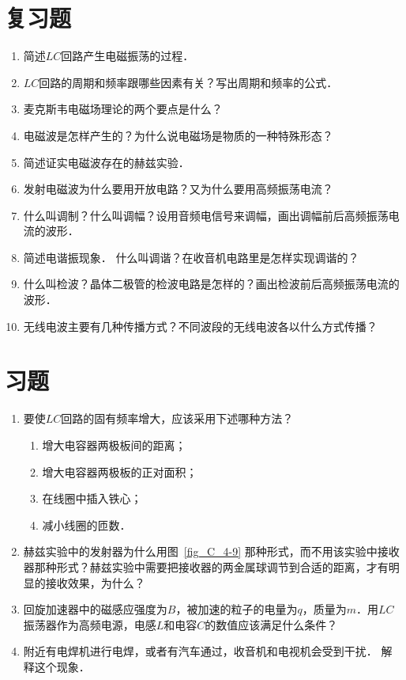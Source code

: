 \section*{复习题}
\begin{enumerate}
    \item 简述$LC$回路产生电磁振荡的过程．
    \item $LC$回路的周期和频率跟哪些因素有关？写出周期和频率的公式．
    \item 麦克斯韦电磁场理论的两个要点是什么？
    \item 电磁波是怎样产生的？为什么说电磁场是物质的一种特殊形态？
    \item 简述证实电磁波存在的赫兹实验．
    \item 发射电磁波为什么要用开放电路？又为什么要用高频振荡电流？
    \item 什么叫调制？什么叫调幅？设用音频电信号来调幅，画出调幅前后高频振荡电流的波形．
    \item 简述电谐振现象．
    什么叫调谐？在收音机电路里是怎样实现调谐的？
    \item 什么叫检波？晶体二极管的检波电路是怎样的？画出检波前后高频振荡电流的波形．
    \item 无线电波主要有几种传播方式？不同波段的无线电波各以什么方式传播？
\end{enumerate}

\section*{习题}
\begin{enumerate}
    \item 要使$LC$回路的固有频率增大，应该采用下述哪种方法？
    \begin{enumerate}
        \item 增大电容器两极板间的距离；
        \item 增大电容器两极板的正对面积；
        \item 在线圈中插入铁心；
        \item 减小线圈的匝数．
    \end{enumerate}
    \item 赫兹实验中的发射器为什么用图~\ref{fig_C_4-9} 那种形式，而不用该实验中接收器那种形式？赫兹实验中需要把接收器的两金属球调节到合适的距离，才有明显的接收效果，为什么？
    \item 回旋加速器中的磁感应强度为$B$，被加速的粒子的电量为$q$，质量为$m$．用$LC$振荡器作为高频电源，电感$L$和电容$C$的数值应该满足什么条件？
    \item 附近有电焊机进行电焊，或者有汽车通过，收音机和电视机会受到干扰．
    解释这个现象．
\end{enumerate}



